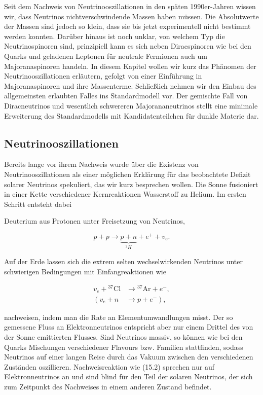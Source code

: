 \documentclass[10pt, letterpaper]{article}
\begin{document}
Seit dem Nachweis von Neutrinooszillationen in den späten 1990er-Jahren wissen wir, dass Neutrinos nichtverschwindende Massen haben müssen. Die Absolutwerte der Massen sind jedoch so klein, dass sie bis jetzt experimentell nicht bestimmt werden konnten. Darüber hinaus ist noch unklar, von welchem Typ die Neutrinospinoren sind, prinzipiell kann es sich neben Diracspinoren wie bei den Quarks und geladenen Leptonen für neutrale Fermionen auch um Majoranaspinoren handeln. In diesem Kapitel wollen wir kurz das Phänomen der Neutrinooszillationen erläutern, gefolgt von einer Einführung in Majoranaspinoren und ihre Massenterme. Schließlich nehmen wir den Einbau des allgemeinsten erlaubten Falles ins Standardmodell vor. Der gemischte Fall von Diracneutrinos und wesentlich schwereren Majorananeutrinos stellt eine minimale Erweiterung des Standardmodells mit Kandidatenteilchen für dunkle Materie dar.

\subsection*{Neutrinooszillationen}
Bereits lange vor ihrem Nachweis wurde über die Existenz von Neutrinooszillationen als einer möglichen Erklärung für das beobachtete Defizit solarer Neutrinos spekuliert, das wir kurz besprechen wollen. Die Sonne fusioniert in einer Kette verschiedener Kernreaktionen Wasserstoff zu Helium. Im ersten Schritt entsteht dabei

Deuterium aus Protonen unter Freisetzung von Neutrinos,

$$
p+p \longrightarrow \underbrace{p+n}_{{ }^{2} H}+e^{+}+v_{e} .
$$

Auf der Erde lassen sich die extrem selten wechselwirkenden Neutrinos unter schwierigen Bedingungen mit Einfangreaktionen wie

$$
\begin{aligned}
v_{e}+{ }^{37} \mathrm{Cl} & \longrightarrow{ }^{37} \mathrm{Ar}+e^{-}, \\
\left(v_{e}+n\right. & \left.\longrightarrow p+e^{-}\right),
\end{aligned}
$$

nachweisen, indem man die Rate an Elementumwandlungen misst. Der so gemessene Fluss an Elektronneutrinos entspricht aber nur einem Drittel des von der Sonne emittierten Flusses. Sind Neutrinos massiv, so können wie bei den Quarks Mischungen verschiedener Flavours bzw. Familien stattfinden, sodass Neutrinos auf einer langen Reise durch das Vakuum zwischen den verschiedenen Zuständen oszillieren. Nachweisreaktion wie (15.2) sprechen nur auf Elektronneutrinos an und sind blind für den Teil der solaren Neutrinos, der sich zum Zeitpunkt des Nachweises in einem anderen Zustand befindet.
\end{document}

